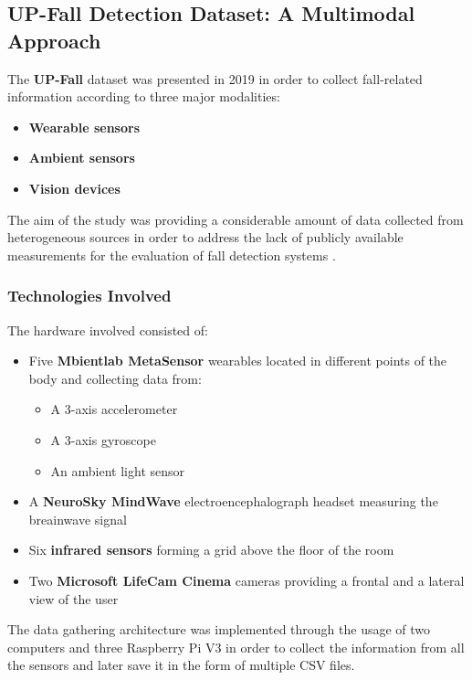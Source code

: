 \subsection{UP-Fall Detection Dataset: A Multimodal Approach}\label{sec:upfall}

The \textbf{UP-Fall} dataset was presented in 2019 in order to collect fall-related information according to three major modalities:

\begin{itemize}
    \item \textbf{Wearable sensors}
    \item \textbf{Ambient sensors}
    \item \textbf{Vision devices}
\end{itemize}

The aim of the study was providing a considerable amount of data collected from heterogeneous sources in order to address the lack of publicly available measurements for the evaluation of fall detection systems \cite{upfall}.

\subsubsection{Technologies Involved}\label{subsubsec:upfall-technologies}

The hardware involved consisted of: 

\begin{itemize}
\item Five \textbf{Mbientlab MetaSensor} wearables located in different points of the body and collecting data from: 
    \begin{itemize}
        \item A 3-axis accelerometer
        \item A 3-axis gyroscope
        \item An ambient light sensor
    \end{itemize}
\item A \textbf{NeuroSky MindWave} electroencephalograph headset measuring the breainwave signal
\item Six \textbf{infrared sensors} forming a grid above the floor of the room
\item Two \textbf{Microsoft LifeCam Cinema} cameras providing a frontal and a lateral view of the user
\end{itemize}

The data gathering architecture was implemented through the usage of two computers and three Raspberry Pi V3 in order to collect the information from all the sensors and later save it in the form of multiple CSV files.

